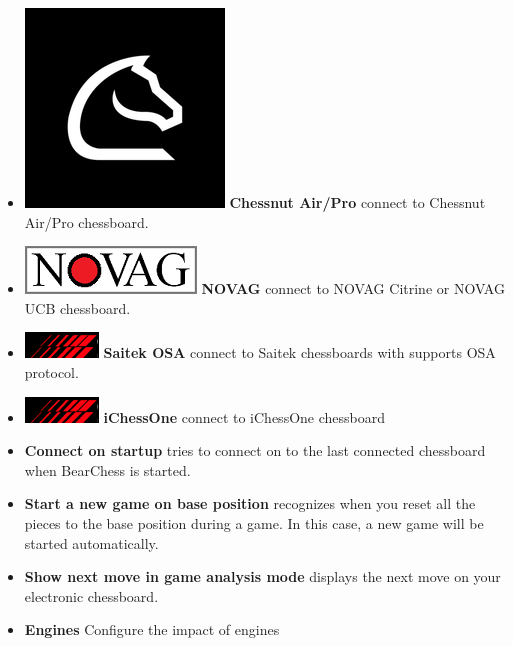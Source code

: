 \documentclass[11pt,a4paper]{article}
\begin{document}
\begin{itemize}
	\item  \includegraphics[scale=0.1]{chessnut.png} \textbf{Chessnut Air/Pro} connect to Chessnut Air/Pro chessboard.		
	\item  \includegraphics[scale=0.3]{novag48.PNG} \textbf{NOVAG} connect to NOVAG Citrine or NOVAG UCB chessboard.			
    \item  \includegraphics[scale=0.4]{Saitek_logo.PNG} \textbf{Saitek OSA} connect to Saitek chessboards with supports OSA protocol.		
    \item  \includegraphics[scale=0.4]{Saitek_logo.PNG} \textbf{iChessOne} connect to iChessOne chessboard 
	\item \textbf{Connect on startup} tries to connect on to the last connected chessboard when BearChess is started. 	
	\item \textbf{Start a new game on base position} recognizes when you reset all the pieces to the base position during a game. In this case, a new game will be started automatically.
    \item \textbf{Show next move in game analysis mode} displays the next move on your electronic chessboard.
    \item \textbf{Engines} Configure the impact of engines

\end{itemize}
\end{document}
